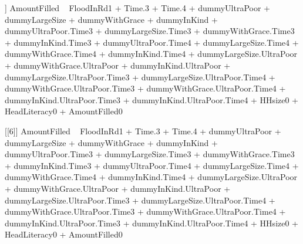 \begin{Schunk}
\begin{Soutput}
[[5]]
AmountFilled ~ FloodInRd1 + Time.3 + Time.4 + dummyUltraPoor + 
    dummyLargeSize + dummyWithGrace + dummyInKind + dummyUltraPoor.Time3 + 
    dummyLargeSize.Time3 + dummyWithGrace.Time3 + dummyInKind.Time3 + 
    dummyUltraPoor.Time4 + dummyLargeSize.Time4 + dummyWithGrace.Time4 + 
    dummyInKind.Time4 + dummyLargeSize.UltraPoor + dummyWithGrace.UltraPoor + 
    dummyInKind.UltraPoor + dummyLargeSize.UltraPoor.Time3 + 
    dummyLargeSize.UltraPoor.Time4 + dummyWithGrace.UltraPoor.Time3 + 
    dummyWithGrace.UltraPoor.Time4 + dummyInKind.UltraPoor.Time3 + 
    dummyInKind.UltraPoor.Time4 + HHsize0 + HeadLiteracy0 + AmountFilled0

[[6]]
AmountFilled ~ FloodInRd1 + Time.3 + Time.4 + dummyUltraPoor + 
    dummyLargeSize + dummyWithGrace + dummyInKind + dummyUltraPoor.Time3 + 
    dummyLargeSize.Time3 + dummyWithGrace.Time3 + dummyInKind.Time3 + 
    dummyUltraPoor.Time4 + dummyLargeSize.Time4 + dummyWithGrace.Time4 + 
    dummyInKind.Time4 + dummyLargeSize.UltraPoor + dummyWithGrace.UltraPoor + 
    dummyInKind.UltraPoor + dummyLargeSize.UltraPoor.Time3 + 
    dummyLargeSize.UltraPoor.Time4 + dummyWithGrace.UltraPoor.Time3 + 
    dummyWithGrace.UltraPoor.Time4 + dummyInKind.UltraPoor.Time3 + 
    dummyInKind.UltraPoor.Time4 + HHsize0 + HeadLiteracy0 + AmountFilled0
\end{Soutput}
\end{Schunk}



